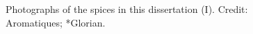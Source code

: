 \begin{figure}[!ht]
	\hfill
	\hfill
	\caption[Photographs of the spices in this dissertation (I)]{Photographs of the spices in this dissertation (I). Credit: Aromatiques; *Glorian.}
	\label{fig:spice_imgs1}
\end{figure}

